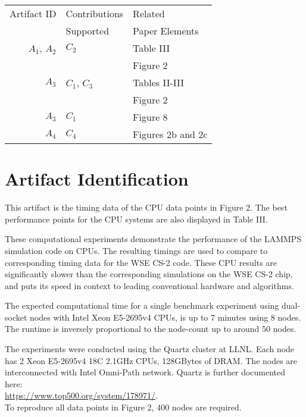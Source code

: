 \documentclass[conference]{IEEEtran}
\begin{document}
\begin{center}
\begin{tabular}{rll}
\toprule
Artifact ID  &  Contributions &  Related \\
             &  Supported     &  Paper Elements \\
\midrule
$A_1$, $A_2$   &  $C_2$ & Table III \\
        &        & Figure 2\\
\midrule
$A_3$   &  $C_1$, $C_3$ & Tables II-III \\
        &        & Figure 2\\
        \midrule
$A_3$   &  $C_1$ & Figure 8\\
\midrule
$A_4$   &  $C_4$ & Figures 2b and 2c\\
\bottomrule
\end{tabular}
\end{center}

\section{Artifact Identification}

\newartifact

\artrel

This artifact is the timing data of the CPU data points in Figure 2. The best performance points for the CPU systems are also displayed in Table III.

\artexp

These computational experiments demonstrate the performance of the LAMMPS simulation code on CPUs. The resulting timings are used to compare to corresponding timing data for the WSE CS-2 code. These CPU results are significantly slower than the corresponding simulations on the WSE CS-2 chip, and puts its speed in context to leading conventional hardware and algorithms.

\arttime

The expected computational time for a single benchmark experiment using dual-socket nodes with Intel Xeon E5-2695v4 CPUs, is up to 7 minutes using 8 nodes. The runtime is inversely proportional to the node-count up to around 50 nodes.

\artin


The experiments were conducted using the Quartz cluster at LLNL. Each node has 2 Xeon E5-2695v4 18C 2.1GHz CPUs, 128GBytes of DRAM. The nodes are interconnected with Intel Omni-Path network. Quartz is further documented here:\\ \phantom{xxx}\url{https://www.top500.org/system/178971/}.\\
%
To reproduce all data points in Figure 2, 400 nodes are required.
\end{document}
